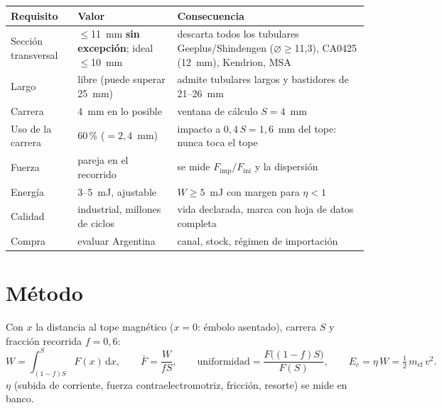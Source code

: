 \documentclass[11pt,a4paper]{article}
\begin{document}
\begin{table}[H]\centering\small
\begin{tabular}{p{3.6cm} p{4.4cm} p{6.4cm}}
\toprule
Requisito & Valor & Consecuencia\\
\midrule
Sección transversal & $\leq$11~mm \textbf{sin excepción}; ideal $\leq$10~mm & descarta todos los tubulares Geeplus/Shindengen ($\varnothing\geq$11,3), CA0425 (12~mm), Kendrion, MSA\\
Largo & libre (puede superar 25~mm) & admite tubulares largos y bastidores de 21--26~mm\\
Carrera & 4~mm en lo posible & ventana de cálculo $S=4$~mm\\
Uso de la carrera & 60\,\% ($=2{,}4$~mm) & impacto a $0{,}4\,S=1{,}6$~mm del tope: nunca toca el tope\\
Fuerza & pareja en el recorrido & se mide $F_\mathrm{imp}/F_\mathrm{ini}$ y la dispersión\\
Energía & 3--5~mJ, ajustable & $W\geq5$~mJ con margen para $\eta<1$\\
Calidad & industrial, millones de ciclos & vida declarada, marca con hoja de datos completa\\
Compra & evaluar Argentina & canal, stock, régimen de importación\\
\bottomrule
\end{tabular}
\end{table}

\section{Método}
Con $x$ la distancia al tope magnético ($x=0$: émbolo asentado), carrera $S$ y fracción recorrida $f=0{,}6$:
\begin{equation*}
W=\int_{(1-f)S}^{S}F(x)\,\mathrm{d}x,\qquad
\bar F=\frac{W}{fS},\qquad
\text{uniformidad}=\frac{F\big((1-f)S\big)}{F(S)},\qquad
E_c=\eta\,W=\tfrac12\,m_\mathrm{ef}\,v^2 .
\end{equation*}
$\eta$ (subida de corriente, fuerza contraelectromotriz, fricción, resorte) se mide en banco.
\end{document}
